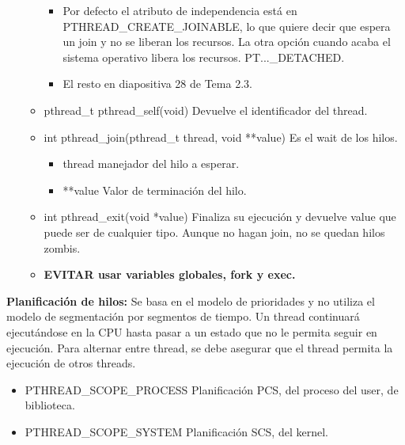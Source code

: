 \documentclass[12pt, twoside, openright]{report} %
\begin{document}
\begin{itemize}
\begin{itemize}
\begin{itemize}
      \item Por defecto el atributo de independencia está en
        PTHREAD\_CREATE\_JOINABLE, lo que quiere decir que espera un
        join y no se liberan los recursos. La otra opción cuando acaba
        el sistema operativo libera los recursos. PT...\_DETACHED.
        
      \item El resto en diapositiva 28 de Tema 2.3.
        
      \end{itemize}
    \item pthread\_t pthread\_self(void) Devuelve el identificador del
      thread.
      
    \item int pthread\_join(pthread\_t thread, void **value) Es el wait de
      los hilos.
      

      \begin{itemize}
      \item thread manejador del hilo a esperar.
        
      \item **value Valor de terminación del hilo.
        
      \end{itemize}
    \item int pthread\_exit(void *value) Finaliza su ejecución y devuelve
      value que puede ser de cualquier tipo. Aunque no hagan join, no se
      quedan hilos zombis.
      
    \item \textbf{EVITAR usar variables globales, fork y exec.}
      
    \end{itemize}
  \end{itemize}
\textbf{Planificación de hilos:} Se basa en el modelo de prioridades y
  no utiliza el modelo de segmentación por segmentos de tiempo. Un
  thread continuará ejecutándose en la CPU hasta pasar a un estado que
  no le permita seguir en ejecución. Para alternar entre thread, se debe
  asegurar que el thread permita la ejecución de otros threads.
  

  \begin{itemize}
  \item PTHREAD\_SCOPE\_PROCESS Planificación PCS, del proceso del user, de
    biblioteca.
    
  \item PTHREAD\_SCOPE\_SYSTEM Planificación SCS, del kernel.
    
  \end{itemize}
\end{document}

